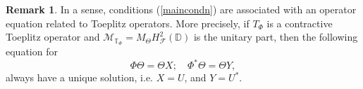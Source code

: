 \documentclass[12pt]{amsart}
\numberwithin{equation}{section}
\theoremstyle{definition}
\newtheorem{rem}{Remark}[section]
\newcommand{\Nat}{\mathbb{N}}
\newcommand{\D}{\mathbb{D}}
\newcommand{\T}{\mathbb{T}}
\newcommand{\1}{{\mbox{\bf 1}}}
\newcommand{\cle}{\mathcal{E}}
\newcommand{\clf}{\mathcal{F}}
\newcommand{\clk}{\mathcal{K}}
\newcommand{\clm}{\mathcal{M}}
\newcommand{\clw}{\mathcal{W}}
\begin{document}
\begin{rem}
In a sense, conditions (\ref{maincondn}) are associated with an operator equation related to Toeplitz operators. More precisely, if $T_{\Phi}$ is a contractive Toeplitz operator and $\clm_{\T_{\Phi}} = M_{\Theta}H_{\clf}^2(\D)$ is the unitary part, then the following equation for 
\[
\Phi \Theta = \Theta X; \quad \Phi^* \Theta = \Theta Y,
\]
always have a unique solution, i.e. $X= U$, and $Y = U^*$.
\end{rem}

\end{document}
